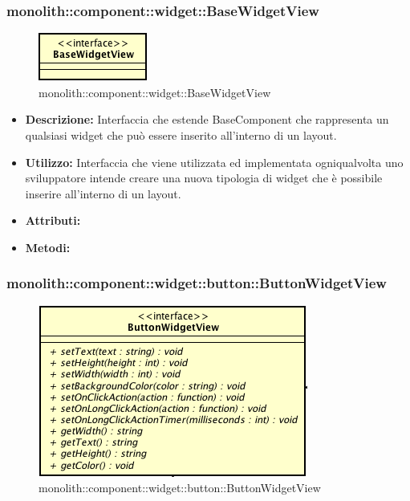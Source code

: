 \subsubsection{monolith::component::widget::BaseWidgetView}

\label{monolith::component::widget::BaseWidgetView}
\begin{figure}[ht]
	\centering
	\includegraphics[scale=0.5]{Sezioni/SottosezioniST/img/BaseWidgetView.png}
	\caption{monolith::component::widget::BaseWidgetView}
\end{figure}

\begin{itemize}
\item \textbf{Descrizione:} Interfaccia che estende BaseComponent che rappresenta un qualsiasi widget che può essere inserito all'interno di un layout.
\item \textbf{Utilizzo:} Interfaccia che viene utilizzata ed implementata ogniqualvolta uno sviluppatore intende creare una nuova tipologia di widget che è possibile inserire all'interno di un layout.
\item \textbf{Attributi:}
\item \textbf{Metodi:}
\end{itemize}

\subsubsection{monolith::component::widget::button::ButtonWidgetView}

\label{monolith::component::widget::button::ButtonWidgetView}
\begin{figure}[ht]
	\centering
	\includegraphics[scale=0.5]{Sezioni/SottosezioniST/img/ButtonWidgetView.png}
	\caption{monolith::component::widget::button::ButtonWidgetView}
\end{figure}

